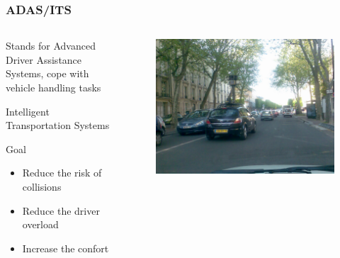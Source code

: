 \documentclass{beamer}
\begin{document}
	\begin{frame}
		\frametitle{ADAS/ITS}
		
		\begin{columns}[t]
		  \begin{column}{5cm}
			\begin{exampleblock}{Stands for}	
				Advanced Driver Assistance Systems, cope with vehicle handling tasks
				
				Intelligent Transportation Systems
			\end{exampleblock}		
			\begin{block}{Goal}
				\begin{itemize}
				\item Reduce the risk of collisions
				\item Reduce the driver overload
				\item Increase the confort
				\end{itemize}
			\end{block}
		  \end{column}
		  
		  \begin{column}{5cm}
		  \begin{figure}[h]
			\center
			\includegraphics[scale=0.15]{img/fig:street:urban}
		  \end{figure}   
		  \end{column}
		 \end{columns}

	\end{frame}	
\end{document}
